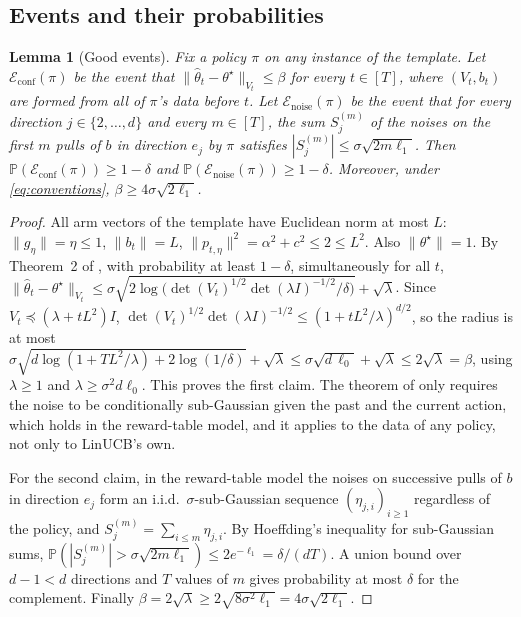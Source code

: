\documentclass{article}
\newtheorem{lemma}{Lemma}
\theoremstyle{definition}
\theoremstyle{remark}
\newcommand{\Prb}{\mathbb{P}}
\theoremstyle{remark}
\begin{document}
\subsection{Events and their probabilities}

\begin{lemma}[Good events]
\label{lem:cat-events}
Fix a policy $\pi$ on any instance of the template. Let
$\mathcal E_{\mathrm{conf}}(\pi)$ be the event that
$\|\widehat\theta_t-\theta^\star\|_{V_t}\le\beta$ for every $t\in[T]$, where
$(V_t,b_t)$ are formed from all of $\pi$'s data before $t$. Let
$\mathcal E_{\mathrm{noise}}(\pi)$ be the event that for every direction
$j\in\{2,\dots,d\}$ and every $m\in[T]$, the sum $S_j^{(m)}$ of the noises on
the first $m$ pulls of $b$ in direction $e_j$ by $\pi$ satisfies
$|S_j^{(m)}|\le\sigma\sqrt{2m\ell_1}$. Then
$\Prb(\mathcal E_{\mathrm{conf}}(\pi))\ge1-\delta$ and
$\Prb(\mathcal E_{\mathrm{noise}}(\pi))\ge1-\delta$. Moreover, under
\eqref{eq:conventions}, $\beta\ge4\sigma\sqrt{2\ell_1}$.
\end{lemma}

\begin{proof}
All arm vectors of the template have Euclidean norm at most $L$: $\|g_\eta\|=\eta\le1$,
$\|b_t\|=L$, $\|p_{t,\eta}\|^2=\alpha^2+c^2\le2\le L^2$. Also $\|\theta^\star\|=1$.
By Theorem~2 of \cite{abbasi2011improved}, with probability at least
$1-\delta$, simultaneously for all $t$,
$\|\widehat\theta_t-\theta^\star\|_{V_t}\le\sigma\sqrt{2\log\bigl(\det(V_t)^{1/2}\det(\lambda I)^{-1/2}/\delta\bigr)}+\sqrt\lambda$.
Since $V_t\preceq(\lambda+tL^2)I$, $\det(V_t)^{1/2}\det(\lambda I)^{-1/2}\le(1+tL^2/\lambda)^{d/2}$,
so the radius is at most
$\sigma\sqrt{d\log(1+TL^2/\lambda)+2\log(1/\delta)}+\sqrt\lambda\le\sigma\sqrt{d\,\ell_0}+\sqrt\lambda\le2\sqrt\lambda=\beta$,
using $\lambda\ge1$ and $\lambda\ge\sigma^2d\ell_0$. This proves the first claim.
The theorem of \cite{abbasi2011improved} only requires the noise to be
conditionally sub-Gaussian given the past and the current action, which holds
in the reward-table model, and it applies to the data of any policy, not only
to LinUCB's own.

For the second claim, in the reward-table model the noises on successive pulls
of $b$ in direction $e_j$ form an i.i.d.\ $\sigma$-sub-Gaussian sequence
$(\eta_{j,i})_{i\ge1}$ regardless of the policy, and $S_j^{(m)}=\sum_{i\le m}\eta_{j,i}$.
By Hoeffding's inequality for sub-Gaussian sums,
$\Prb(|S_j^{(m)}|>\sigma\sqrt{2m\ell_1})\le2e^{-\ell_1}=\delta/(dT)$. A union
bound over $d-1<d$ directions and $T$ values of $m$ gives probability at most
$\delta$ for the complement. Finally $\beta=2\sqrt\lambda\ge2\sqrt{8\sigma^2\ell_1}=4\sigma\sqrt{2\ell_1}$.
\end{proof}
\end{document}
